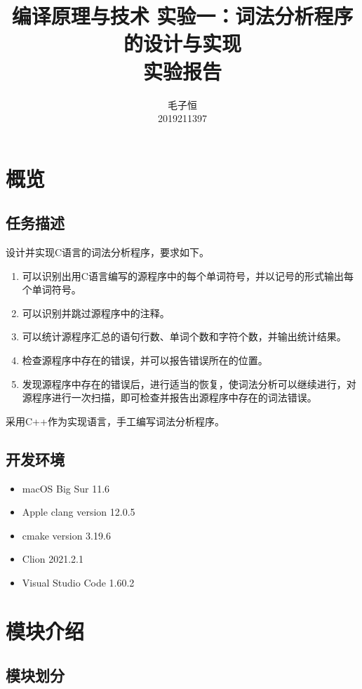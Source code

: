\documentclass[lang=cn,11pt,a4paper,cite=authornum]{paper}
\title{编译原理与技术 实验一：词法分析程序的设计与实现 \\ 实验报告}
\author{毛子恒 \\ 2019211397}
\institute{北京邮电大学\ 计算机学院}
\date{\zhtoday}
\begin{document}
\maketitle

\section{概览}

\subsection{任务描述}

设计并实现C语言的词法分析程序，要求如下。

\begin{enumerate}
    \item 可以识别出用C语言编写的源程序中的每个单词符号，并以记号的形式输出每个单词符号。
    \item 可以识别并跳过源程序中的注释。
    \item 可以统计源程序汇总的语句行数、单词个数和字符个数，并输出统计结果。
    \item 检查源程序中存在的错误，并可以报告错误所在的位置。
    \item 发现源程序中存在的错误后，进行适当的恢复，使词法分析可以继续进行，对源程序进行一次扫描，即可检查并报告出源程序中存在的词法错误。
\end{enumerate}

采用C++作为实现语言，手工编写词法分析程序。

\subsection{开发环境}

\begin{itemize}
    \item macOS Big Sur 11.6
    \item Apple clang version 12.0.5
    \item cmake version 3.19.6
    \item Clion 2021.2.1
    \item Visual Studio Code 1.60.2
\end{itemize}

\section{模块介绍}

\subsection{模块划分}
\end{document}
